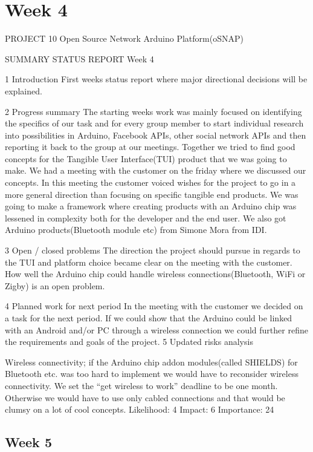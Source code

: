 \section{Week 4}

PROJECT 10 Open Source Network Arduino Platform(oSNAP)

SUMMARY STATUS REPORT
Week 4

1 Introduction
First weeks status report where major directional decisions will be explained.

2 Progress summary
The starting weeks work was mainly focused on identifying the specifics of our task and for
every group member to start individual research into possibilities in Arduino, Facebook APIs,
other social network APIs and then reporting it back to the group at our meetings. Together we
tried to find good concepts for the Tangible User Interface(TUI) product that we was going to
make. We had a meeting with the customer on the friday where we discussed our concepts. In
this meeting the customer voiced wishes for the project to go in a more general direction than
focusing on specific tangible end products. We was going to make a framework where creating
products with an Arduino chip was lessened in complexity both for the developer and the end
user.
We also got Arduino products(Bluetooth module etc) from Simone Mora from IDI.

3 Open / closed problems
The direction the project should pursue in regards to the TUI and platform choice became clear
on the meeting with the customer.
How well the Arduino chip could handle wireless connections(Bluetooth, WiFi or Zigby) is an
open problem.

4 Planned work for next period
In the meeting with the customer we decided on a task for the next period. If we could show that
the Arduino could be linked with an Android and/or PC through a wireless connection we could
further refine the requirements and goals of the project.
5 Updated risks analysis

Wireless connectivity; if the Arduino chip addon modules(called SHIELDS) for Bluetooth etc.
was too hard to implement we would have to reconsider wireless connectivity. We set the “get
wireless to work” deadline to be one month. Otherwise we would have to use only cabled
connections and that would be clumsy on a lot of cool concepts.
Likelihood: 4 Impact: 6 Importance: 24

\subsection{Week 5}

